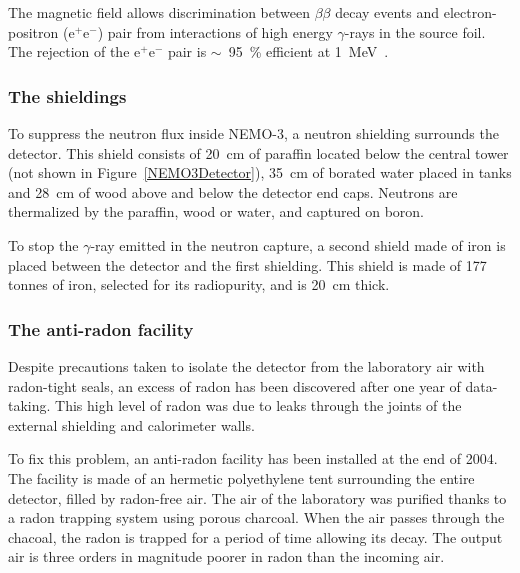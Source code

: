 \documentclass[main.tex]{subfiles}
\begin{document}
\bigskip


\NI The magnetic field allows discrimination between $\beta\beta$ decay events and electron-positron (e$^+$e$^-$) pair from interactions of high energy $\gamma$-rays in the source foil. The rejection of the e$^+$e$^-$ pair is $\sim$~95~\% efficient at 1~MeV~\cite{NEMO-3-detector}. 

\bigskip


\subsubsection{The shieldings}


\NI To suppress the neutron flux inside NEMO-3, a neutron shielding surrounds the detector. This shield consists of 20~cm of paraffin located below the central tower (not shown in Figure~\ref{NEMO3Detector}), 35~cm of borated water placed in tanks and 28~cm of wood above and below the detector end caps. Neutrons are thermalized by the paraffin, wood or water, and captured on boron. 


\bigskip

\NI To stop the $\gamma$-ray emitted in the neutron capture, a second shield made of iron is placed between the detector and the first shielding. This shield is made of 177 tonnes of iron, selected for its radiopurity, and is 20~cm thick.


\subsubsection{The anti-radon facility}


\NI Despite precautions taken to isolate the detector from the laboratory air with radon-tight seals, an excess of radon has been discovered after one year of data-taking. This high level of radon was due to leaks through the joints of the external shielding and calorimeter walls.


\bigskip


\NI To fix this problem, an anti-radon facility has been installed at the end of 2004. The facility is made of an hermetic polyethylene tent surrounding the entire detector, filled by radon-free air. The air of the laboratory was purified thanks to a radon trapping system using porous charcoal. When the air passes through the chacoal, the radon is trapped for a period of time allowing its decay. The output air is three orders in magnitude poorer in radon than the incoming air.


\bigskip
\end{document}
